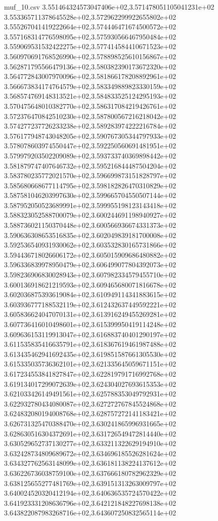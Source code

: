 \begin{filecontents*}{muf_10.csv}
3.551464324573047406e+02,3.571478051105041231e+02
3.553365711378645528e+02,3.572962299922655802e+02
3.555267041419222664e+02,3.574446471674500572e+02
3.557168314776598095e+02,3.575930566467950484e+02
3.559069531532422275e+02,3.577414584410671523e+02
3.560970691768526990e+02,3.578898525610156867e+02
3.562871795566479136e+02,3.580382390173672320e+02
3.564772843007970096e+02,3.581866178208892961e+02
3.566673834174764579e+02,3.583349889823330159e+02
3.568574769148313521e+02,3.584833525124295193e+02
3.570475648010382770e+02,3.586317084219426761e+02
3.572376470842510230e+02,3.587800567216218042e+02
3.574277237726233238e+02,3.589283974222216784e+02
3.576177948743048205e+02,3.590767305344797933e+02
3.578078603974550447e+02,3.592250560691481951e+02
3.579979203502209089e+02,3.593733740369898442e+02
3.581879747407646732e+02,3.595216844487504204e+02
3.583780235772021570e+02,3.596699873151828797e+02
3.585680668677114795e+02,3.598182826470310829e+02
3.587581046203997630e+02,3.599665704550507144e+02
3.587952050523689991e+02,3.599955198123143418e+02
3.588323052588700079e+02,3.600244691198940927e+02
3.588736021150370448e+02,3.600566936674331373e+02
3.590636308653516835e+02,3.602049839181700008e+02
3.592536540931930062e+02,3.603532830165731866e+02
3.594436718026606172e+02,3.605015909686480882e+02
3.596336839978950479e+02,3.606499077804392073e+02
3.598236906830028943e+02,3.607982334579455710e+02
3.600136918621219593e+02,3.609465680071816678e+02
3.602036875393619084e+02,3.610949114341883615e+02
3.603936777188532119e+02,3.612432637449592221e+02
3.605836624047070131e+02,3.613916249455269281e+02
3.607736416010498601e+02,3.615399950419114248e+02
3.609636153119913047e+02,3.616883740401290197e+02
3.611535835416635791e+02,3.618367619461987488e+02
3.613435462941692435e+02,3.619851587661305530e+02
3.615335035736362101e+02,3.621335645059671151e+02
3.617234553841827847e+02,3.622819791716992768e+02
3.619134017299072639e+02,3.624304027693615353e+02
3.621033426149491561e+02,3.625788353049792931e+02
3.622932780434080087e+02,3.627272767845524868e+02
3.624832080194008768e+02,3.628757272141183421e+02
3.626731325470388470e+02,3.630241865996931665e+02
3.628630516304372691e+02,3.631726549472814440e+02
3.630529652737130277e+02,3.633211322629194910e+02
3.632428734809689672e+02,3.634696185526281624e+02
3.634327762563148099e+02,3.636181138224137612e+02
3.636226736038759100e+02,3.637666180782962329e+02
3.638125655277481769e+02,3.639151313263009797e+02
3.640024520320412194e+02,3.640636535724570422e+02
3.641923331208636796e+02,3.642121848227698138e+02
3.643822087983268716e+02,3.643607250832565114e+02

\end{filecontents*}

